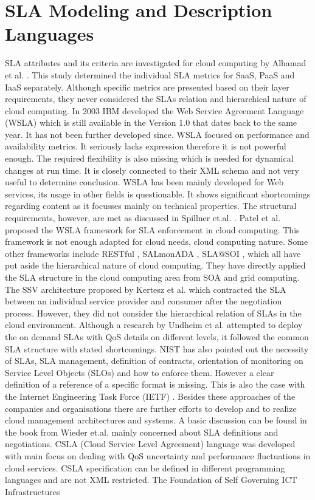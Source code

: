 \section{SLA Modeling and Description Languages}
SLA attributes and its criteria are investigated for cloud computing by Alhamad et al.  \cite{5610586}. This study determined the individual SLA metrics for SaaS, PaaS and IaaS separately. Although specific metrics are presented based on their layer requirements, they never considered the SLAs relation and hierarchical nature of cloud computing. In 2003 IBM developed the Web Service Agreement Language (WSLA)  \cite{Ludwig03WSLA} which is still available in the Version 1.0 that dates back to the same year. It has not been further developed since. WSLA focused on performance and availability metrics. It seriously lacks expression therefore it is not powerful enough. The required flexibility is also missing which is needed for dynamical changes at run time. It is closely connected to their XML schema and not very useful to determine conclusion. WSLA has been mainly developed for Web services, its usage in other fields is questionable. It shows significant shortcomings regarding content as it focusses mainly on technical properties. The structural requirements, however, are met as discussed in Spillner et.al.  \cite{Spillner2009}. Patel et al.  \cite{Patel2009ServiceLA} proposed the WSLA framework for SLA enforcement in cloud computing. This framework is not enough adapted for cloud needs, cloud computing nature. Some other frameworks include RESTful  \cite{Kubert:2011:RIW:1967428.1967444}, SALmonADA  \cite{6225938}, SLA@SOI  \cite{slasoi2011}, which all have put aside the hierarchical nature of cloud computing. They have directly applied the SLA structure in the cloud computing area from SOA and grid computing. The SSV architecture proposed by Kertesz et al.  \cite{5739040} which contracted the SLA between an individual service provider and consumer after the negotiation process. However, they did not consider the hierarchical relation of SLAs in the cloud environment. Although a research by Undheim et al.  \cite{6076508} attempted to deploy the on demand SLAs with QoS details on different levels, it followed the common SLA structure with stated shortcomings. NIST  \cite{Liu2011} has also pointed out the necessity of SLAs, SLA management, definition of contracts, orientation of monitoring on Service Level Objects (SLOs) and how to enforce them. However a clear definition of a reference of a specific format is missing. This is also the case with the Internet Engineering Task Force (IETF)  \cite{Khasnabish2010}. Besides these approaches of the companies and organisations there are further efforts to develop and to realize cloud management architectures and systems. A basic discussion can be found in the book from Wieder et.al.  \cite{Wieder2011} mainly concerned about SLA definitions and negotiations. CSLA  \cite{kouki2014language} (Cloud Service Level Agreement) language was developed with main focus on dealing with QoS uncertainty and performance fluctuations in cloud services. CSLA specification can be defined in different programming languages and are not XML restricted. The Foundation of Self Governing ICT Infrastructures 